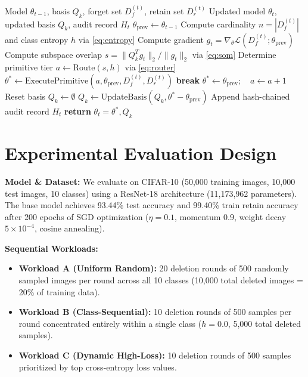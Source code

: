 \documentclass[conference]{IEEEtran}
\begin{document}
\begin{algorithm}[htbp]
\caption{ASUC-SOM Sequential Unlearning Routine}
\label{alg:asuc}
\small
\begin{algorithmic}[1]
\REQUIRE Model $\theta_{t-1}$, basis $Q_k$, forget set $D_f^{(t)}$, retain set $D_r^{(t)}$
\ENSURE Updated model $\theta_t$, updated basis $Q_k$, audit record $H_t$
\STATE $\theta_{\text{prev}} \leftarrow \theta_{t-1}$ \hfill {}
\STATE Compute cardinality $n = |D_f^{(t)}|$ and class entropy $h$ via \eqref{eq:entropy}
\STATE Compute gradient $g_t = \nabla_\theta \mathcal{L}(D_f^{(t)}; \theta_{\text{prev}})$
\STATE Compute subspace overlap $s = \|Q_k^T g_t\|_2 / \|g_t\|_2$ via \eqref{eq:som}
\STATE Determine primitive tier $a \leftarrow \text{Route}(s, h)$ via \eqref{eq:router}
\REPEAT
    \STATE $\theta^* \leftarrow \text{ExecutePrimitive}(a, \theta_{\text{prev}}, D_f^{(t)}, D_r^{(t)})$
        \STATE \textbf{break}
    \ENDIF
    \STATE $\theta^* \leftarrow \theta_{\text{prev}}; \quad a \leftarrow a + 1$ \hfill {}
    \STATE Reset basis $Q_k \leftarrow \emptyset$ \hfill {}
\ELSE
    \STATE $Q_k \leftarrow \text{UpdateBasis}(Q_k, \theta^* - \theta_{\text{prev}})$
\ENDIF
\STATE Append hash-chained audit record $H_t$
\STATE \textbf{return} $\theta_t = \theta^*, Q_k$
\end{algorithmic}
\end{algorithm}

\section{Experimental Evaluation Design}
\textbf{Model \& Dataset:} We evaluate on CIFAR-10 \cite{b11} (50,000 training images, 10,000 test images, 10 classes) using a ResNet-18 architecture (11,173,962 parameters). The base model achieves 93.44\% test accuracy and 99.40\% train retain accuracy after 200 epochs of SGD optimization ($\eta=0.1$, momentum 0.9, weight decay $5\times 10^{-4}$, cosine annealing).

\textbf{Sequential Workloads:}
\begin{itemize}
    \item \textbf{Workload A (Uniform Random):} 20 deletion rounds of 500 randomly sampled images per round across all 10 classes (10,000 total deleted images = 20\% of training data).
    \item \textbf{Workload B (Class-Sequential):} 10 deletion rounds of 500 samples per round concentrated entirely within a single class ($h = 0.0$, 5,000 total deleted samples).
    \item \textbf{Workload C (Dynamic High-Loss):} 10 deletion rounds of 500 samples prioritized by top cross-entropy loss values.
\end{itemize}
\end{document}
